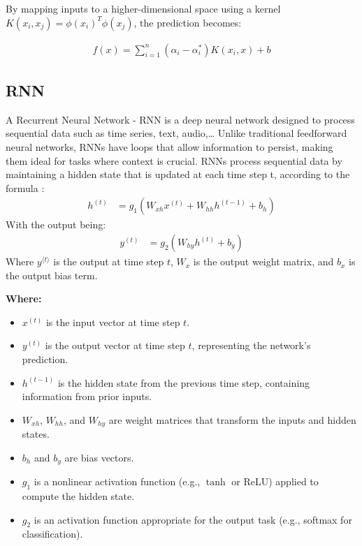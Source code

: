 \documentclass[12pt]{article}
\begin{document}
By mapping inputs to a higher-dimensional space using a kernel \(K(x_i, x_j) = \phi(x_i)^T \phi(x_j)\), the prediction becomes:

\begin{align}
    f(x) = \sum_{i=1}^n (\alpha_i - \alpha_i^*) K(x_i, x) + b
\end{align}


\subsection{RNN}
A Recurrent Neural Network - RNN is a deep neural network designed to process sequential data such as time series, text, audio,… Unlike traditional feedforward neural networks, RNNs have loops that allow information to persist, making them ideal for tasks where context is crucial.
RNNs process sequential data by maintaining a hidden state that is updated at each time step t, according to the formula \cite{schmidt2019rnn} :
\begin{align}
h^{(t)} &= g_1\left(W_{xh} x^{(t)} + W_{hh} h^{(t-1)} + b_h\right)
\end{align}
With the output being:
\begin{align}
    y^{(t)} &= g_2\left(W_{hy} h^{(t)} + b_y\right)
\end{align}
Where \( y^{\langle t \rangle} \) is the output at time step \( t \), \( W_x \) is the output weight matrix, and \( b_x \) is the output bias term.

\textbf{Where:}
\begin{itemize}
    \item \( x^{(t)} \) is the input vector at time step \( t \).
    \item \( y^{(t)} \) is the output vector at time step \( t \), representing the network's prediction.

    \item \( h^{(t-1)} \) is the hidden state from the previous time step, containing information from prior inputs.
    \item \( W_{xh} \), \( W_{hh} \), and \( W_{hy} \) are weight matrices that transform the inputs and hidden states.
    \item \( b_h \) and \( b_y \) are bias vectors.
    \item \( g_1 \) is a nonlinear activation function (e.g., \(\tanh\) or ReLU) applied to compute the hidden state.
    \item \( g_2 \) is an activation function appropriate for the output task (e.g., softmax for classification).
\end{itemize}
\end{document}
